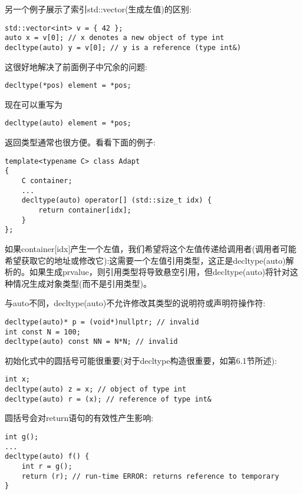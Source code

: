 另一个例子展示了索引std::vector(生成左值)的区别:

\begin{lstlisting}[style=styleCXX]
std::vector<int> v = { 42 };
auto x = v[0]; // x denotes a new object of type int
decltype(auto) y = v[0]; // y is a reference (type int&)
\end{lstlisting}

这很好地解决了前面例子中冗余的问题:

\begin{lstlisting}[style=styleCXX]
decltype(*pos) element = *pos;
\end{lstlisting}

现在可以重写为

\begin{lstlisting}[style=styleCXX]
decltype(auto) element = *pos;
\end{lstlisting}

返回类型通常也很方便。看看下面的例子:

\begin{lstlisting}[style=styleCXX]
template<typename C> class Adapt
{
	C container;
	...
	decltype(auto) operator[] (std::size_t idx) {
		return container[idx];
	}
};
\end{lstlisting}

如果container[idx]产生一个左值，我们希望将这个左值传递给调用者(调用者可能希望获取它的地址或修改它):这需要一个左值引用类型，这正是decltype(auto)解析的。如果生成prvalue，则引用类型将导致悬空引用，但decltype(auto)将针对这种情况生成对象类型(而不是引用类型)。

与auto不同，decltype(auto)不允许修改其类型的说明符或声明符操作符:

\begin{lstlisting}[style=styleCXX]
decltype(auto)* p = (void*)nullptr; // invalid
int const N = 100;
decltype(auto) const NN = N*N; // invalid
\end{lstlisting}

初始化式中的圆括号可能很重要(对于decltype构造很重要，如第6.1节所述):

\begin{lstlisting}[style=styleCXX]
int x;
decltype(auto) z = x; // object of type int
decltype(auto) r = (x); // reference of type int&
\end{lstlisting}

圆括号会对return语句的有效性产生影响:

\begin{lstlisting}[style=styleCXX]
int g();
...
decltype(auto) f() {
	int r = g();
	return (r); // run-time ERROR: returns reference to temporary
}
\end{lstlisting}

